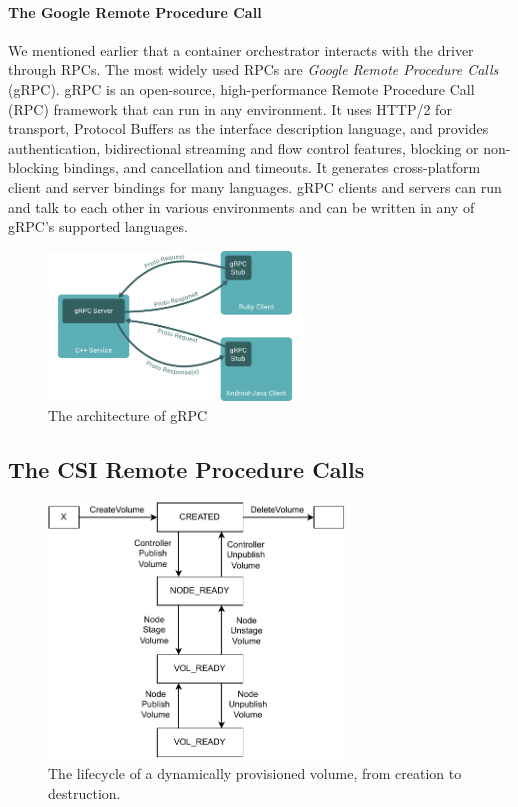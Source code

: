 
\paragraph*{The Google Remote Procedure Call}

We mentioned earlier that a container orchestrator  interacts with the driver
through RPCs. The most widely used RPCs are \textit{Google Remote Procedure
      Calls} (gRPC). gRPC is an open-source, high-performance Remote Procedure Call
(RPC) framework that can run in any environment. It uses HTTP/2 for transport,
Protocol Buffers as the interface description language, and provides
authentication, bidirectional streaming and flow control features, blocking or
non-blocking bindings, and cancellation and timeouts. It generates
cross-platform client and server bindings for many languages. gRPC clients and
servers can run and talk to each other in various environments and can be
written in any of gRPC’s supported languages.

\begin{figure}[ht]
      \centering
      \includegraphics[width=0.6\textwidth]{resources/grpc.png}
      \caption{The architecture of gRPC}
\end{figure}


\subsection{The CSI Remote Procedure Calls}

\begin{figure}[ht]
      \centering
      \includegraphics[width=0.7\textwidth]{resources/csi-states.pdf}
      \caption{The lifecycle of a dynamically provisioned volume, from creation
            to destruction.}
      \label{figure:csi-calls}
\end{figure}

